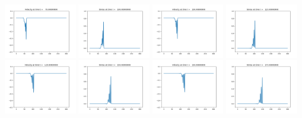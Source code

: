 \documentclass[11pt]{article}
\begin{document}
\includegraphics[width=0.2375\textwidth]{frame0003fig2.png}
\vskip 10pt 
\includegraphics[width=0.2375\textwidth]{frame0004fig1.png}
\includegraphics[width=0.2375\textwidth]{frame0004fig2.png}
\includegraphics[width=0.2375\textwidth]{frame0005fig1.png}
\includegraphics[width=0.2375\textwidth]{frame0005fig2.png}
\vskip 10pt 
\includegraphics[width=0.2375\textwidth]{frame0006fig1.png}
\includegraphics[width=0.2375\textwidth]{frame0006fig2.png}
\includegraphics[width=0.2375\textwidth]{frame0007fig1.png}
\end{document}
